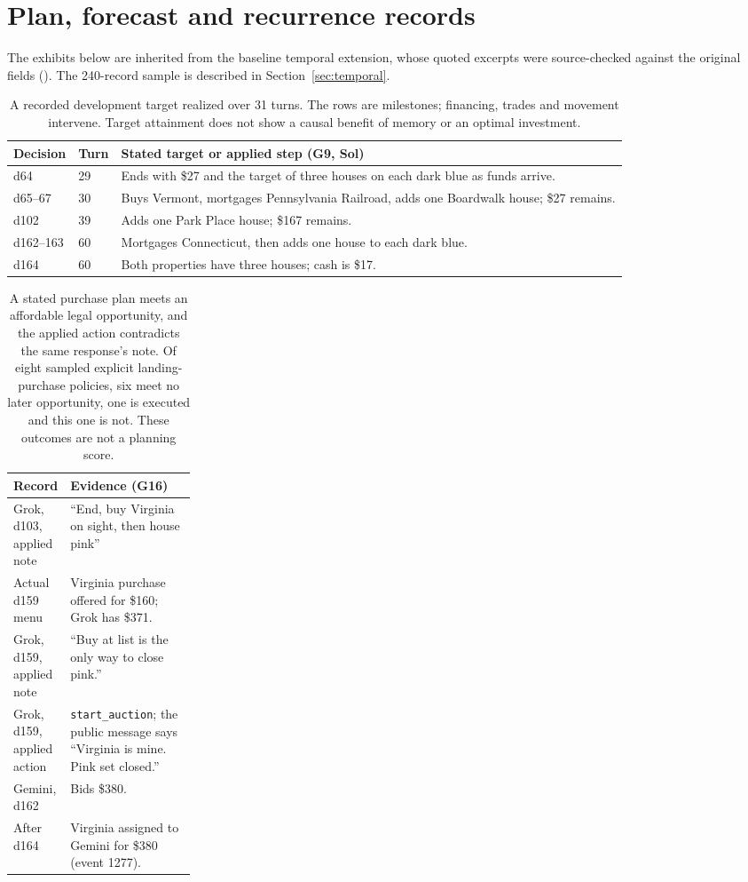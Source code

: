 \section{Plan, forecast and recurrence records}
\label{app:temporal}

The exhibits below are inherited from the baseline temporal extension, whose quoted excerpts were source-checked against the original fields (). The 240-record sample is described in Section~\ref{sec:temporal}.

\begin{table}[htbp]
\centering\small
\begin{tabularx}{\linewidth}{@{}llX@{}}
\toprule
Decision & Turn & Stated target or applied step (G9, Sol)\\
\midrule
d64 & 29 & Ends with \$27 and the target of three houses on each dark blue as funds arrive.\\
d65--67 & 30 & Buys Vermont, mortgages Pennsylvania Railroad, adds one Boardwalk house; \$27 remains.\\
d102 & 39 & Adds one Park Place house; \$167 remains.\\
d162--163 & 60 & Mortgages Connecticut, then adds one house to each dark blue.\\
d164 & 60 & Both properties have three houses; cash is \$17.\\
\bottomrule
\end{tabularx}
\caption{A recorded development target realized over 31 turns. The rows are milestones; financing, trades and movement intervene. Target attainment does not show a causal benefit of memory or an optimal investment.}
\label{tab:g9}
\end{table}

\begin{table}[htbp]
\centering\small
\begin{tabularx}{\linewidth}{@{}p{0.24\linewidth}X@{}}
\toprule
Record & Evidence (G16)\\
\midrule
Grok, d103, applied note & ``End, buy Virginia on sight, then house pink''\\
Actual d159 menu & Virginia purchase offered for \$160; Grok has \$371.\\
Grok, d159, applied note & ``Buy at list is the only way to close pink.''\\
Grok, d159, applied action & \texttt{start\_auction}; the public message says ``Virginia is mine. Pink set closed.''\\
Gemini, d162 & Bids \$380.\\
After d164 & Virginia assigned to Gemini for \$380 (event 1277).\\
\bottomrule
\end{tabularx}
\caption{A stated purchase plan meets an affordable legal opportunity, and the applied action contradicts the same response's note. Of eight sampled explicit landing-purchase policies, six meet no later opportunity, one is executed and this one is not. These outcomes are not a planning score.}
\label{tab:g16}
\end{table}

